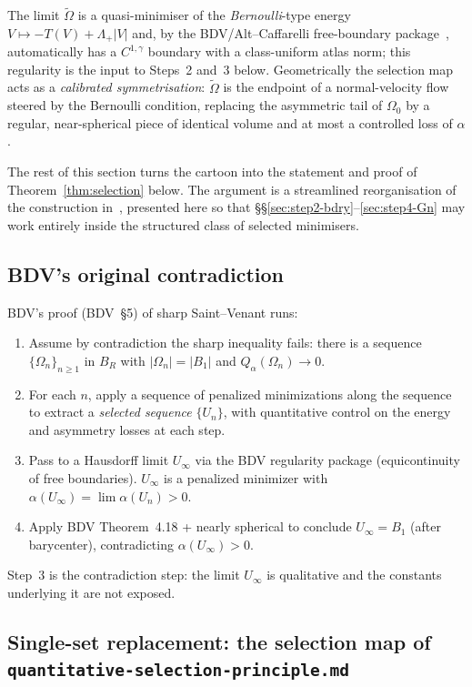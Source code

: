 \documentclass[11pt]{amsart}
\theoremstyle{definition}
\newcommand{\abs}[1]{\left|#1\right|}
\begin{document}
The limit $\widetilde\Omega$ is a quasi-minimiser of the
\emph{Bernoulli}-type energy $V\mapsto-T(V)+\Lambda_+|V|$ and, by the
BDV/Alt--Caffarelli free-boundary
package~\cite[Theorem~4.18]{BDV2015}, automatically has a $C^{1,
\gamma}$ boundary with a class-uniform atlas norm; this regularity is
the input to Steps~2 and~3 below.  Geometrically the selection map
acts as a \emph{calibrated symmetrisation}: $\widetilde\Omega$ is the
endpoint of a normal-velocity flow steered by the Bernoulli
condition, replacing the asymmetric tail of $\Omega_0$ by a regular,
near-spherical piece of identical volume and at most a controlled
loss of $\alpha$.

The rest of this section turns the cartoon into the statement and
proof of Theorem~\ref{thm:selection} below.  The argument is a
streamlined reorganisation of the construction
in~\cite[\S4]{BDV2015}, presented here so that
\S\S\ref{sec:step2-bdry}--\ref{sec:step4-Gn} may work entirely inside
the structured class of selected minimisers.

\subsection{BDV's original contradiction}

BDV's proof (BDV~\S 5) of sharp Saint--Venant runs:
\begin{enumerate}
\item Assume by contradiction the sharp inequality fails: there is a
sequence $\{\Omega_n\}_{n\ge1}$ in $B_R$ with $\abs{\Omega_n}=\abs{B_1}$ and
\(Q_\alpha(\Omega_n)\to 0\).
\item For each $n$, apply a sequence of penalized minimizations along the
sequence to extract a \emph{selected sequence} $\{U_n\}$, with quantitative
control on the energy and asymmetry losses at each step.
\item Pass to a Hausdorff limit $U_\infty$ via the BDV regularity package
(equicontinuity of free boundaries). $U_\infty$ is a penalized minimizer
with $\alpha(U_\infty)=\lim\alpha(U_n)>0$.
\item Apply BDV Theorem~4.18 + nearly spherical to conclude $U_\infty=B_1$
(after barycenter), contradicting $\alpha(U_\infty)>0$.
\end{enumerate}

Step~3 is the contradiction step: the limit $U_\infty$ is qualitative and
the constants underlying it are not exposed.

\subsection{Single-set replacement: the selection map of
\texttt{quantitative-selection-principle.md}}
\end{document}
